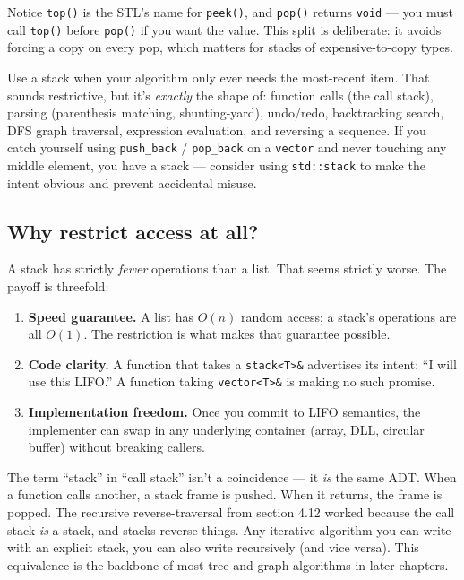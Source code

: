 \documentclass[11pt]{article}
\begin{document}
Notice \texttt{top()} is the STL's name for \texttt{peek()}, and
\texttt{pop()} returns \texttt{void} --- you must call
\texttt{top()} before \texttt{pop()} if you want the value. This
split is deliberate: it avoids forcing a copy on every pop, which
matters for stacks of expensive-to-copy types.

\begin{ideabox}
Use a stack when your algorithm only ever needs the most-recent
item. That sounds restrictive, but it's \emph{exactly} the shape
of: function calls (the call stack), parsing (parenthesis
matching, shunting-yard), undo/redo, backtracking search, DFS
graph traversal, expression evaluation, and reversing a
sequence. If you catch yourself using \texttt{push\_back} /
\texttt{pop\_back} on a \texttt{vector} and never touching any
middle element, you have a stack --- consider using
\texttt{std::stack} to make the intent obvious and prevent
accidental misuse.
\end{ideabox}

\subsection*{Why restrict access at all?}

A stack has strictly \emph{fewer} operations than a list. That
seems strictly worse. The payoff is threefold:

\begin{enumerate}[leftmargin=*]
    \item \textbf{Speed guarantee.} A list has $O(n)$ random access;
          a stack's operations are all $O(1)$. The restriction is
          what makes that guarantee possible.
    \item \textbf{Code clarity.} A function that takes a
          \texttt{stack<T>\&} advertises its intent: ``I will use
          this LIFO.'' A function taking \texttt{vector<T>\&} is
          making no such promise.
    \item \textbf{Implementation freedom.} Once you commit to LIFO
          semantics, the implementer can swap in any underlying
          container (array, DLL, circular buffer) without
          breaking callers.
\end{enumerate}

\begin{notebox}
The term ``stack'' in ``call stack'' isn't a coincidence --- it
\emph{is} the same ADT. When a function calls another, a stack
frame is pushed. When it returns, the frame is popped. The
recursive reverse-traversal from section 4.12 worked because the
call stack \emph{is} a stack, and stacks reverse things. Any
iterative algorithm you can write with an explicit stack, you can
also write recursively (and vice versa). This equivalence is the
backbone of most tree and graph algorithms in later chapters.
\end{notebox}
\end{document}
